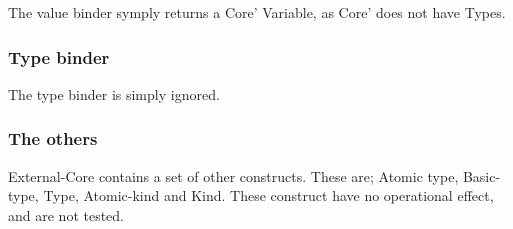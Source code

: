The value binder symply returns a Core' Variable, as Core' does not have Types.


\subsubsection*{Type binder}

The type binder is simply ignored.

\subsubsection*{The others}

External-Core contains a set of other constructs. These are;
Atomic type, Basic-type, Type, Atomic-kind and Kind. These construct
have no operational effect, and are not tested.

\begin{comment}
\subsubsection*{Atomic type}

Types have no effect.

\subsubsection*{Basic type}

Types have no effect.

\subsubsection*{Type}

Types have no effect.

\subsubsection*{Atomic kind}

Kinds have no effect.

\subsubsection*{Kind}

Kinds have no effect.
\end{comment}

